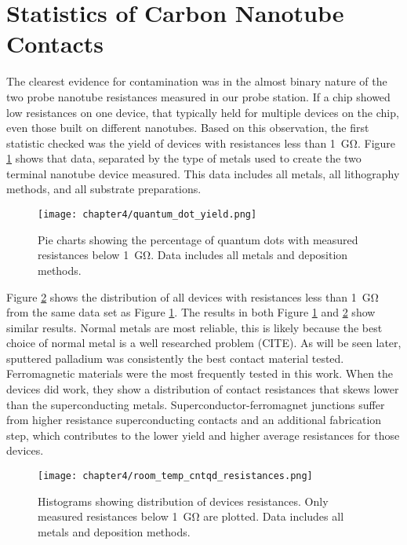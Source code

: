 \section{Statistics of Carbon Nanotube Contacts}

The clearest evidence for contamination was in the almost binary nature of the two probe nanotube resistances measured in our probe station. If a chip showed low resistances on one device, that typically held for multiple devices on the chip, even those built on different nanotubes. Based on this observation, the first statistic checked was the yield of devices with resistances less than \SI{1}{\giga\ohm}. Figure \ref{fig:quantum_dot_yield} shows that data, separated by the type of metals used to create the two terminal nanotube device measured. This data includes all metals, all lithography methods, and all substrate preparations.

\begin{figure}
    \centering
    \texttt{[image: chapter4/quantum\_dot\_yield.png]}
    \caption{Pie charts showing the percentage of quantum dots with measured resistances below \SI{1}{\giga\ohm}. Data includes all metals and deposition methods.}
    \label{fig:quantum_dot_yield}
\end{figure}

Figure \ref{fig:rt_resistances} shows the distribution of all devices with resistances less than \SI{1}{\giga\ohm} from the same data set as Figure \ref{fig:quantum_dot_yield}. The results in both Figure \ref{fig:quantum_dot_yield} and \ref{fig:rt_resistances} show similar results. Normal metals are most reliable, this is likely because the best choice of normal metal is a well researched problem (CITE). As will be seen later, sputtered palladium was consistently the best contact material tested. Ferromagnetic materials were the most frequently tested in this work. When the devices did work, they show a distribution of contact resistances that skews lower than the superconducting metals. Superconductor-ferromagnet junctions suffer from higher resistance superconducting contacts and an additional fabrication step, which contributes to the lower yield and higher average resistances for those devices.

\begin{figure}
    \centering
    \texttt{[image: chapter4/room\_temp\_cntqd\_resistances.png]}
    \caption{Histograms showing distribution of devices resistances. Only measured resistances below \SI{1}{\giga\ohm} are plotted. Data includes all metals and deposition methods.}
    \label{fig:rt_resistances}
\end{figure}

